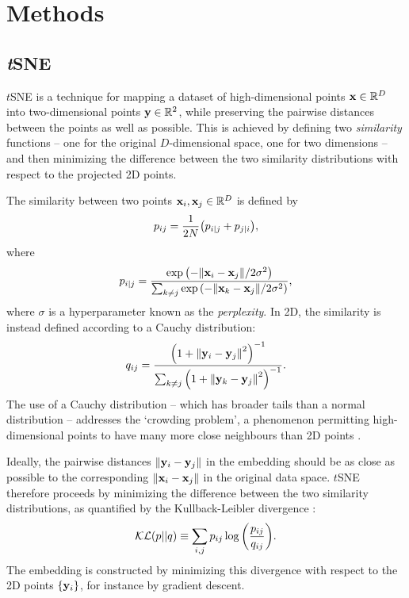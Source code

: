 \documentclass[fleqn,usenatbib]{rasti}
\newcommand\xb{\vb{x}}
\newcommand\yb{\vb{y}}
\begin{document}
\section{Methods} \label{sec:methods}

\subsection{\textit{t}SNE} \label{sec:tsne}

$t$SNE is a technique for mapping a dataset of high-dimensional points $\xb\in\mathbb{R}^D$ into two-dimensional points $\yb\in\mathbb{R}^2$, while preserving the pairwise distances between the points as well as possible.
This is achieved by defining two \textit{similarity} functions -- one for the original $D$-dimensional space, one for two dimensions -- and then minimizing the difference between the two similarity distributions with respect to the projected 2D points.

The similarity between two points $\xb_i, \xb_j \in \mathbb{R}^D$ is defined by
\begin{equation}
p_{ij} = \frac{1}{2N} \qty(p_{i|j} + p_{j|i}),
\end{equation}
where
\begin{equation}
p_{i|j} = \frac{
    \exp\qty(-\norm{\xb_i - \xb_j} / 2\sigma^2)
}{
    \sum_{k\neq j} \exp\qty(-\norm{\xb_k - \xb_j} / 2 \sigma^2)
},
\end{equation}
where $\sigma$ is a hyperparameter known as the \textit{perplexity}.
In 2D, the similarity is instead defined according to a Cauchy distribution:
\begin{equation}
q_{ij} = \frac{
    \qty(1 + \norm{\yb_i - \yb_j}^2)^{-1}
}{
    \sum_{k\neq j} \qty(1 + \norm{\yb_k - \yb_j}^2)^{-1}
}.
\end{equation}
The use of a Cauchy distribution -- which has broader tails than a normal distribution -- addresses the `crowding problem', a phenomenon permitting high-dimensional points to have many more close neighbours than 2D points \citep{vandermaaten08}.

Ideally, the pairwise distances $\norm{\yb_i-\yb_j}$ in the embedding should be as close as possible to the corresponding $\norm{\xb_i-\xb_j}$ in the original data space.
$t$SNE therefore proceeds by minimizing the difference between the two similarity distributions, as quantified by the Kullback-Leibler divergence \citep{kullbackleibler}:
\begin{equation}
\mathcal{KL}(p||q)
\equiv \sum_{i, j} p_{ij} \log \qty(
    \frac{p_{ij}}{q_{ij}}
).
\end{equation}
The embedding is constructed by minimizing this divergence with respect to the 2D points $\{\yb_i\}$, for instance by gradient descent.
\end{document}
